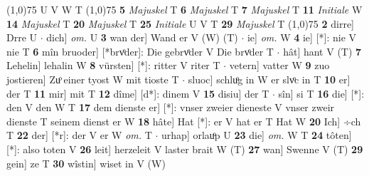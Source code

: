 \documentclass[8pt,a4paper,notitlepage]{article}
\begin{document}
\begin{table}[ht]
\begin{minipage}[t]{0.5\linewidth}
\begin{tabular}{rl}
\end{tabular}
\scriptsize
\line(1,0){75} \newline
U V W T \newline
\line(1,0){75} \newline
\textbf{5} \textit{Majuskel} T  \textbf{6} \textit{Majuskel} T  \textbf{7} \textit{Majuskel} T  \textbf{11} \textit{Initiale} W  \textbf{14} \textit{Majuskel} T  \textbf{20} \textit{Majuskel} T  \textbf{25} \textit{Initiale} U V T  \textbf{29} \textit{Majuskel} T  \newline
\line(1,0){75} \newline
\textbf{2} dirre] Drre U  $\cdot$ dich] \textit{om.} U \textbf{3} wan der] Wand er V (W) (T)  $\cdot$ ie] \textit{om.} W \textbf{4} ie] [*]: nie V nie T \textbf{6} mîn bruoder] [*brvͦder]: Die gebrvͦder V Die brvͦder T  $\cdot$ hât] hant V (T) \textbf{7} Lehelin] lehalin W \textbf{8} vürsten] [*]: ritter V riter T  $\cdot$ vetern] vatter W \textbf{9} zuo jostieren] Zuͦ einer tyost W mit tioste T  $\cdot$ sluoc] schluͦg in W er slvͦc in T \textbf{10} er] der T \textbf{11} mir] mit T \textbf{12} dîme] [d*]: dinem V \textbf{15} disiu] der T  $\cdot$ sîn] si T \textbf{16} die] [*]: den V den W T \textbf{17} dem dienste er] [*]: vnser zweier dieneste V vnser zweir dienste T seinem dienst er W \textbf{18} hâte] Hat [*]: er V hat er T Hat W \textbf{20} Ich] ÷ch T \textbf{22} der] [*r]: der V er W \textit{om.} T  $\cdot$ urhap] orlauͦp U \textbf{23} die] \textit{om.} W T \textbf{24} tôten] [*]: also toten V \textbf{26} leit] herzeleit V laster brait W (T) \textbf{27} wan] Swenne V (T) \textbf{29} gein] ze T \textbf{30} wîstin] wiset in V (W) \newline
\end{minipage}
\end{table}
\end{document}
